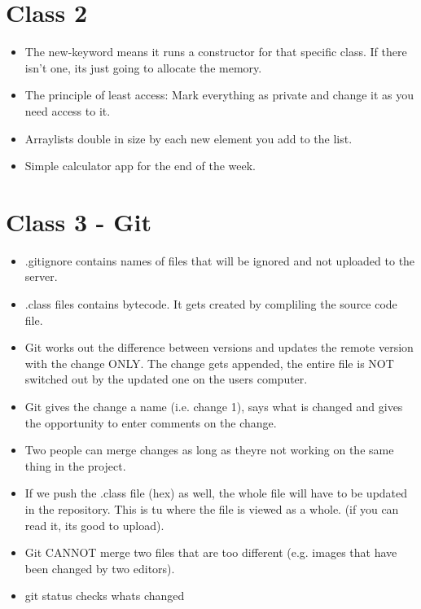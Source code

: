 \documentclass[]{article}
\begin{document}
\section{Class 2}
\begin{itemize}
	\item The new-keyword means it runs a constructor for that specific class. If there isn't one, its just going to allocate the memory.
	\item The principle of least access: Mark everything as private and change it as you need access to it.
	\item Arraylists double in size by each new element you add to the list.
	\item Simple calculator app for the end of the week.
\end{itemize}

\section{Class 3 - Git}
\begin{itemize}
	\item .gitignore contains names of files that will be ignored and not uploaded to the server.
	\item .class files contains bytecode. It gets created by compliling the source code file. 
	\item Git works out the difference between versions and updates the remote version with the change ONLY. The change gets appended, the entire file is NOT switched out by the updated one on the users computer.
	\item Git gives the change a name (i.e. change 1), says what is changed and gives the opportunity to enter comments on the change.
	\item Two people can merge changes as long as theyre not working on the same thing in the project.
	\item If we push the .class file (hex) as well, the whole file will have to be updated in the repository. This is tu where the file is viewed as a whole. (if you can read it, its good to upload).
	\item Git CANNOT merge two files that are too different (e.g. images that have been changed by two editors).
	\item git status checks whats changed
\end{itemize}
\end{document}
